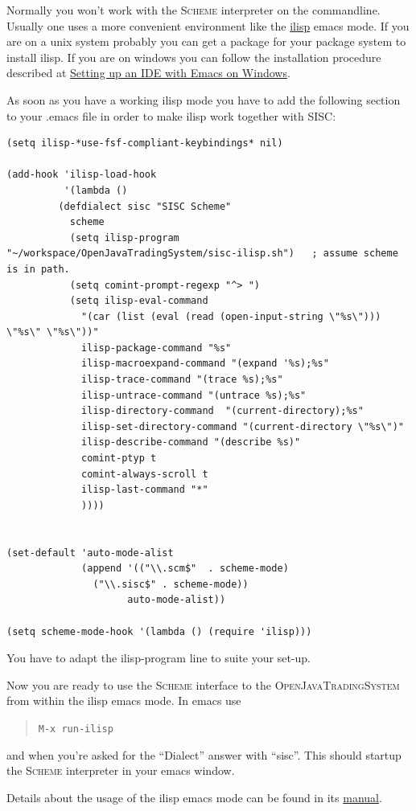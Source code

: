 \documentclass[a4paper,fleqn]{article}
\newcommand{\statementtoexecute} [1]{\begin{quote}\texttt{#1}\end{quote}}
\newcommand{\name}[1]{\textsc{#1}}
\newcommand{\OpenJavaTradingSystem}{\name{OpenJavaTradingSystem}}
\newcommand{\Scheme}{\name{Scheme}}
\begin{document}
\noindent Normally you won't work with the \Scheme{} interpreter on
the commandline. Usually one uses a more convenient environment like
the \href{http://sourceforge.net/projects/ilisp/}{ilisp} emacs
mode. If you are on a unix system probably you can get a package for
your package system to install ilisp. If you are on windows you can
follow the installation procedure described at
\href{http://cl-cookbook.sourceforge.net/windows.html}{Setting up an
IDE with Emacs on Windows}.

As soon as you have a working ilisp mode you have to add the following
section to your .emacs file in order to make ilisp work together with
SISC:
\begin{verbatim}
(setq ilisp-*use-fsf-compliant-keybindings* nil)

(add-hook 'ilisp-load-hook
          '(lambda ()
	     (defdialect sisc "SISC Scheme"
	       scheme
	       (setq ilisp-program "~/workspace/OpenJavaTradingSystem/sisc-ilisp.sh")	; assume scheme is in path.
	       (setq comint-prompt-regexp "^> ")
	       (setq ilisp-eval-command
		     "(car (list (eval (read (open-input-string \"%s\"))) \"%s\" \"%s\"))"
		     ilisp-package-command "%s"
		     ilisp-macroexpand-command "(expand '%s);%s"
		     ilisp-trace-command "(trace %s);%s"
		     ilisp-untrace-command "(untrace %s);%s"
		     ilisp-directory-command  "(current-directory);%s"
		     ilisp-set-directory-command "(current-directory \"%s\")"
		     ilisp-describe-command "(describe %s)"
		     comint-ptyp t
		     comint-always-scroll t
		     ilisp-last-command "*"
		     ))))
	       

(set-default 'auto-mode-alist
             (append '(("\\.scm$"  . scheme-mode)
		       ("\\.sisc$" . scheme-mode))
                     auto-mode-alist))

(setq scheme-mode-hook '(lambda () (require 'ilisp)))
\end{verbatim}
You have to adapt the ilisp-program line to suite your set-up. 

Now you are ready to use the \Scheme{} interface to the
\OpenJavaTradingSystem{} from within the ilisp emacs mode. In emacs
use \statementtoexecute{M-x run-ilisp} and when you're asked for the
``Dialect'' answer with ``sisc''. This should startup the \Scheme{}
interpreter in your emacs window.

Details about the usage of the ilisp emacs mode can be found in its
\href{http://www.xemacs.org/Documentation/packages/html/ilisp.html}{manual}.
\end{document}
